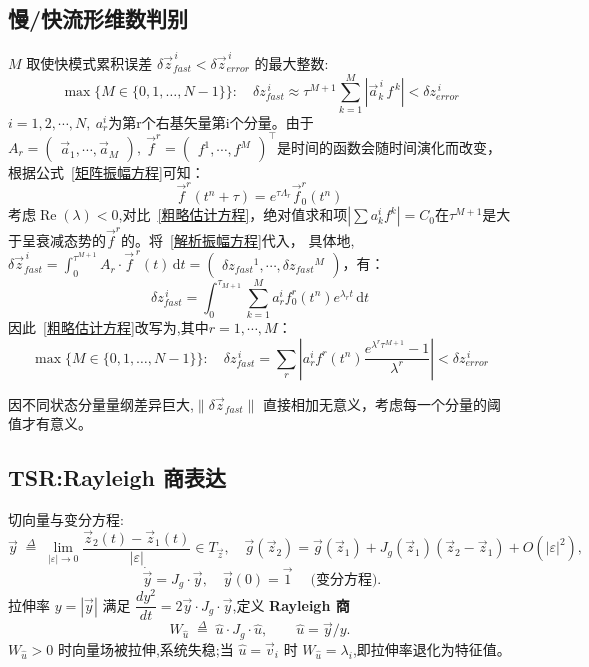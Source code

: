 \documentclass[11pt,a4paper]{article}
\newcommand{\Jg}{J_{\!g}}
\newcommand{\rmd}{\mathrm{d}}
\DeclareMathOperator{\Real}{Re}
\begin{document}
\subsection{慢/快流形维数判别}
$M$ 取使快模式累积误差 $\delta\vec z^{\,i}_{fast}<\delta\vec z^{\,i}_{error}$ 的最大整数:
\begin{equation}
\max\bigl\{M\in\{0,1,\dots,N-1\}\bigr\}:\quad
\delta z^{\,i}_{fast}\approx\tau^{M+1}\sum_{k=1}^{M}|\vec a_k^{\,i}\,f^{\,k}|<\delta z^{\,i}_{error}
\label{粗略估计方程}
\end{equation}
$i=1,2, \cdots, N,\ a^i_r$为第r个右基矢量第i个分量。由于$A_r=\begin{pmatrix}\vec a_1,\cdots,\vec a_M \end{pmatrix}, \ \vec f^r =\begin{pmatrix}f^1, \cdots, f^M \end{pmatrix}^{\top}$是时间的函数会随时间演化而改变，根据公式~\eqref{矩阵振幅方程}可知：
\begin{equation}
	\vec f^r(t^n+\tau)=e^{\tau\Lambda_r}\vec f^r_0(t^n)
	\label{解析振幅方程}
\end{equation}
考虑$\Real(\lambda)<0$,对比~\eqref{粗略估计方程}，绝对值求和项$|\sum a^i_kf^k|=C_0$在$\tau^{M+1}$是大于呈衰减态势的$\vec f^r$的。将~\eqref{解析振幅方程}代入，
具体地,$\delta\vec z^{\,i}_{fast}=\int_{0}^{\tau^{M+1}}\!A_r\cdot\vec f^{\,r}(t)\,\rmd t=\begin{pmatrix}\delta{z_{fast}}^1,\cdots,\delta{z_{fast}}^M\end{pmatrix}$，有：
\begin{equation}
	\delta z^{\,i}_{fast}=\int_{0}^{\tau_{M+1}}\sum_{k=1}^{M}a_r^if_0^r(t^n)e^{\lambda_rt}\,\rmd t
\end{equation}
因此~\eqref{粗略估计方程}改写为,其中$r=1,\cdots, M$：
\begin{equation}
	\max\bigl\{M\in\{0,1,\dots,N-1\}\bigr\}:\quad \delta z^{\,i}_{fast}=\sum_{r}|a_r^if^r(t^n)\frac{e^{\lambda^r\tau^{M+1}}-1}{\lambda^r}|<\delta z^{\,i}_{error}
\end{equation}


因不同状态分量量纲差异巨大,$\|\delta\vec z_{fast}\|$ 直接相加无意义，考虑每一个分量的阈值才有意义。

\subsection{TSR:Rayleigh 商表达}

切向量与变分方程:
\begin{equation}
\vec y\;\overset{\Delta}{=}\;\lim_{|\varepsilon|\to 0}\frac{\vec z_2(t)-\vec z_1(t)}{|\varepsilon|}\in T_{\vec z},\quad
\vec g(\vec z_2)=\vec g(\vec z_1)+\Jg(\vec z_1)(\vec z_2-\vec z_1)+O(|\varepsilon|^2),
\end{equation}
\begin{equation}
\boxed{\;\dot{\vec y}=\Jg\cdot\vec y,\quad \vec y(0)=\vec 1\;}\quad\text{(变分方程)}.
\end{equation}
拉伸率 $y=|\vec y|$ 满足 $\dfrac{d y^2}{dt}=2\vec y\cdot\Jg\cdot\vec y$,定义 \textbf{Rayleigh 商}
\[
W_{\hat u}\;\overset{\Delta}{=}\;\hat u\cdot\Jg\cdot\hat u,\qquad \hat u=\vec y/y.
\]
$W_{\hat u}>0$ 时向量场被拉伸,系统失稳;当 $\hat u=\vec v_i$ 时 $W_{\hat u}=\lambda_i$,即拉伸率退化为特征值。
\end{document}
